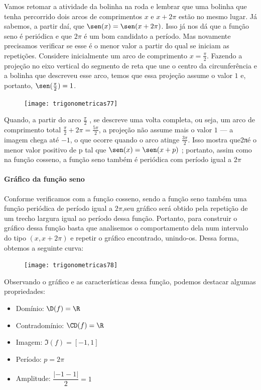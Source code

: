 Vamos retomar a atividade da bolinha na roda e lembrar que uma bolinha que tenha percorrido dois arcos de comprimentos $x$ e $x+2\pi$ estão no mesmo lugar. Já sabemos, a partir daí, que $\sen(x)=\sen(x+2\pi)$. Isso já nos dá que a função seno é periódica e que $2\pi$ é um bom candidato a período. Mas novamente precisamos verificar se esse é o menor valor a partir do qual se iniciam as repetições. Considere inicialmente um arco de comprimento $x=\frac{\pi}{2}$. Fazendo a projeção no eixo vertical do segmento de reta que une o centro da circunferência e a bolinha que descreveu esse arco, temos que essa projeção assume o valor $1$ e, portanto, $\sen(\frac{\pi}{2})=1$.

\begin{figure}[H]
\centering

\texttt{[image: trigonometricas77]}
\end{figure}

Quando, a partir do arco $\frac{\pi}{2}$ , se descreve uma volta completa, ou seja, um arco de comprimento total  $\frac{\pi}{2}+2\pi=\frac{5\pi}{2}$, a projeção não assume mais o valor $1$ --- a imagem chega até $-1$, o que ocorre quando o arco atinge $\frac{3\pi}{2}$. Isso mostra que2πé o menor valor positivo de p tal que $\sen(x)=\sen(x+p)$ ; portanto, assim como na função cosseno, a função seno também é periódica com período igual a $2\pi$

\paragraph{Gráfico da função seno}

Conforme verificamos com a função cosseno, sendo a função seno também uma função periódica de período igual a $2\pi$,seu gráfico será obtido pela repetição de um trecho largura igual ao período dessa função. Portanto, para construir o gráfico dessa função basta que analisemos o comportamento dela num intervalo do tipo $(x, x+2π)$ e repetir o gráfico encontrado, unindo-os. Dessa forma, obtemos a seguinte curva:

\begin{figure}[H]
\centering

\texttt{[image: trigonometricas78]}
\end{figure}

Observando o gráfico e as características dessa função, podemos destacar algumas propriedades:
\begin{itemize}
\item Domínio: $\D(f)=\R$
\item Contradomínio: $\CD(f)=\R$
\item Imagem: $\Im(f)=[-1,1]$
\item Período: $p=2\pi$
\item Amplitude: $\dfrac{|-1-1|}{2}=1$
\end{itemize}

